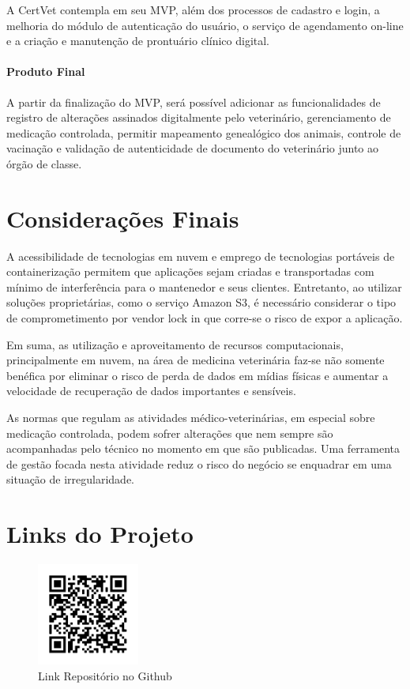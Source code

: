 \documentclass[
    12pt,               %
    openright,          %
    oneside,
    a4paper,            %
    BIBLATEX,           %
    TODO,               %
    english,            %
    brazil              %
    ]{ifsp-spo-inf-ctds}
\begin{document}
            A CertVet contempla em seu MVP, além dos processos de cadastro e login, a melhoria do módulo de autenticação do usuário, o serviço de agendamento on-line e a criação e manutenção de prontuário clínico digital.
        
        \subsubsection{Produto Final}
        
            A partir da finalização do MVP, será possível adicionar as funcionalidades de registro de alterações assinados digitalmente pelo veterinário, gerenciamento de medicação controlada, permitir mapeamento genealógico dos animais, controle de vacinação e validação de autenticidade de documento do veterinário junto ao órgão de classe.

\chapter[Considerações Finais]{Considerações Finais}

    A acessibilidade de tecnologias em nuvem e emprego de tecnologias portáveis de containerização permitem que aplicações sejam criadas e transportadas com mínimo de interferência para o mantenedor e seus clientes. Entretanto, ao utilizar soluções proprietárias, como o serviço Amazon S3, é necessário considerar o tipo de comprometimento por vendor lock in que corre-se o risco de expor a aplicação.

    Em suma, as utilização e aproveitamento de recursos computacionais, principalmente em nuvem, na área de medicina veterinária faz-se não somente benéfica por eliminar o risco de perda de dados em mídias físicas e aumentar a velocidade de recuperação de dados importantes e sensíveis.

    As normas que regulam as atividades médico-veterinárias, em especial sobre medicação controlada, podem sofrer alterações que nem sempre são acompanhadas pelo técnico no momento em que são publicadas. Uma ferramenta de gestão focada nesta atividade reduz o risco do negócio se enquadrar em uma situação de irregularidade.

\chapter[Links do Projeto]{Links do Projeto}
    \begin{figure} [htb!]
        \centering
        \includegraphics[width=0.3\textwidth]{qrcode/qrcode_GIT.png}
        \caption{Link Repositório no Github}
        \label{fig:qrcode_GIT}
    \end{figure}
    
\end{document}
